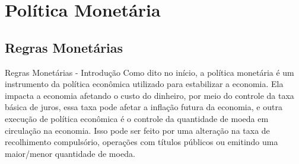 \documentclass[xcolor=dvipsnames]{beamer}
\begin{document}
\section{Política Monetária}
\subsection{Regras Monetárias}
\begin{frame}{Regras Monetárias - Introdução}
Como dito no início, a política monetária é um instrumento da política econômica utilizado para estabilizar a economia. Ela impacta a economia afetando o custo do dinheiro, por meio do controle da taxa básica de juros, essa taxa pode afetar a inflação futura da economia, e outra execução de política econômica é o controle da quantidade de moeda em circulação na economia. Isso pode ser feito por uma alteração na taxa de recolhimento compulsório, operações com títulos públicos ou emitindo uma maior/menor quantidade de moeda. 
\end{frame}
\end{document}
